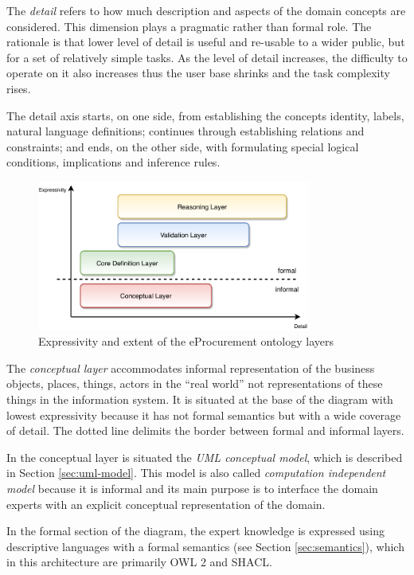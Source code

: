 	The \textit{detail} refers to how much description and aspects of the domain concepts are considered. This dimension plays a pragmatic rather than formal role. The rationale is that lower level of detail is useful and re-usable to a wider public, but for a set of relatively simple tasks. As the level of detail increases, the difficulty to operate on it also increases thus the user base shrinks and the task complexity rises. 
	
	The detail axis starts, on one side, from establishing the concepts identity, labels, natural language  definitions; continues through establishing relations and constraints; and ends, on the other side, with formulating special logical conditions, implications and inference rules.
	
	\begin{figure}[!ht]
		\centering
		\includegraphics[width=0.8\textwidth]{../img/eProcurement-layers}
		\caption{Expressivity and extent of the eProcurement ontology layers}
		\label{fig:layers}
	\end{figure}
	
	The \textit{conceptual layer} accommodates informal representation of the business objects, places, things, actors in the ``real world'' not representations of these things in the information system. It is situated at the base of the diagram with lowest expressivity because it has not formal semantics but with a wide coverage of detail. The dotted line delimits the border between formal and informal layers.
	
	In the conceptual layer is situated the \textit{UML conceptual model}, which is described in Section \ref{sec:uml-model}. This model is also called \textit{computation independent model} because it is informal and its main purpose is to interface the domain experts with an explicit conceptual representation of the domain.
		
	In the formal section of the diagram, the expert knowledge is expressed using descriptive languages with a formal semantics (see Section \ref{sec:semantics}), which in this architecture are primarily OWL 2\cite{owl2} and SHACL\cite{shacl-spec}. 
		
